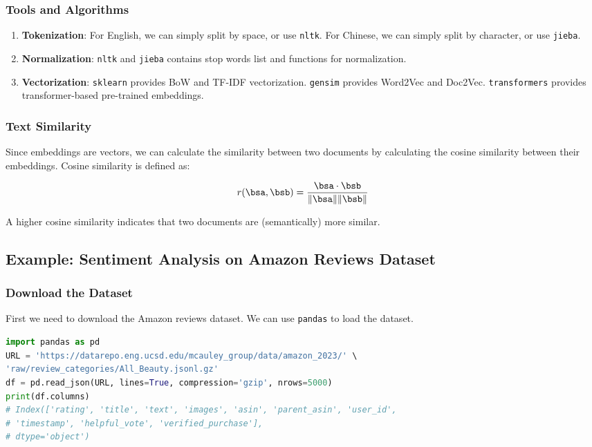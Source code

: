 \documentclass[beamer, en, version=2.0]{huangfusl-template}
\begin{document}
    \begin{frame}[fragile]
        \frametitle{Tools and Algorithms}

        \begin{enumerate}
            \item \textbf{Tokenization}: For English, we can simply split by space, or use {\footnotesize\color{darkred}\verb|nltk|}. For Chinese, we can simply split by character, or use {\footnotesize\color{darkred}\verb|jieba|}.
            \item \textbf{Normalization}: {\footnotesize\color{darkred}\verb|nltk|} and {\footnotesize\color{darkred}\verb|jieba|} contains stop words list and functions for normalization.
            \item \textbf{Vectorization}: {\footnotesize\color{darkred}\verb|sklearn|} provides BoW and TF-IDF vectorization. {\footnotesize\color{darkred}\verb|gensim|} provides Word2Vec and Doc2Vec. {\footnotesize\color{darkred}\verb|transformers|} provides transformer-based pre-trained embeddings.
        \end{enumerate}
    \end{frame}

    \begin{frame}
        \frametitle{Text Similarity}

        Since embeddings are vectors, we can calculate the similarity between two documents by calculating the cosine similarity between their embeddings. Cosine similarity is defined as:

        \begin{equation}
            r(\bsa, \bsb) = \frac{\bsa\cdot\bsb}{\|\bsa\|\|\bsb\|}
        \end{equation}

        A higher cosine similarity indicates that two documents are (semantically) more similar.
    \end{frame}

    \subsection{Example: Sentiment Analysis on Amazon Reviews Dataset}

    \begin{frame}[fragile]
        \frametitle{Download the Dataset}

        First we need to download the Amazon reviews dataset. We can use {\footnotesize\color{darkred}\verb|pandas|} to load the dataset.

\begin{lstlisting}[language=python, breaklines]
import pandas as pd
URL = 'https://datarepo.eng.ucsd.edu/mcauley_group/data/amazon_2023/' \
'raw/review_categories/All_Beauty.jsonl.gz'
df = pd.read_json(URL, lines=True, compression='gzip', nrows=5000)
print(df.columns)
# Index(['rating', 'title', 'text', 'images', 'asin', 'parent_asin', 'user_id',
# 'timestamp', 'helpful_vote', 'verified_purchase'],
# dtype='object')
\end{lstlisting}
    \end{frame}
\end{document}

